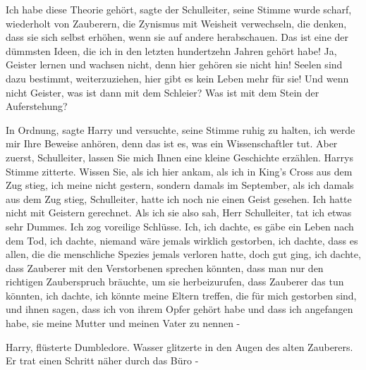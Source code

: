 \glqq{}Ich habe diese Theorie gehört\grqq{}, sagte der Schulleiter, seine Stimme
wurde scharf, \glqq{}wiederholt von Zauberern, die Zynismus mit Weisheit
verwechseln, die denken, dass sie sich selbst erhöhen, wenn sie auf andere
herabschauen. Das ist eine der dümmsten Ideen, die ich in den letzten
hundertzehn Jahren gehört habe! Ja, Geister lernen und wachsen nicht, denn hier
gehören sie nicht hin! Seelen sind dazu bestimmt, weiterzuziehen, hier gibt es
kein Leben mehr für sie! Und wenn nicht Geister, was ist dann mit dem Schleier?
Was ist mit dem Stein der Auferstehung?\grqq{}

\glqq{}In Ordnung\grqq{}, sagte Harry und versuchte, seine Stimme ruhig zu
halten, \glqq{}ich werde mir Ihre Beweise anhören, denn das ist es, was ein
Wissenschaftler tut. Aber zuerst, Schulleiter, lassen Sie mich Ihnen eine kleine
Geschichte erzählen.\grqq{} Harrys Stimme zitterte. \glqq{}Wissen Sie, als ich
hier ankam, als ich in King's Cross aus dem Zug stieg, ich meine nicht gestern,
sondern damals im September, als ich damals aus dem Zug stieg, Schulleiter,
hatte ich noch nie einen Geist gesehen. Ich hatte nicht mit Geistern gerechnet.
Als ich sie also sah, Herr Schulleiter, tat ich etwas sehr Dummes. Ich zog
voreilige Schlüsse. Ich, ich dachte, es gäbe ein Leben nach dem Tod, ich dachte,
niemand wäre jemals wirklich gestorben, ich dachte, dass es allen, die die
menschliche Spezies jemals verloren hatte, doch gut ging, ich dachte, dass
Zauberer mit den Verstorbenen sprechen könnten, dass man nur den richtigen
Zauberspruch bräuchte, um sie herbeizurufen, dass Zauberer das tun könnten, ich
dachte, ich könnte meine Eltern treffen, die für mich gestorben sind, und ihnen
sagen, dass ich von ihrem Opfer gehört habe und dass ich angefangen habe, sie
meine Mutter und meinen Vater zu nennen -\grqq{}

\glqq{}Harry\grqq{}, flüsterte Dumbledore. Wasser glitzerte in den Augen des
alten Zauberers. Er trat einen Schritt näher durch das Büro -

